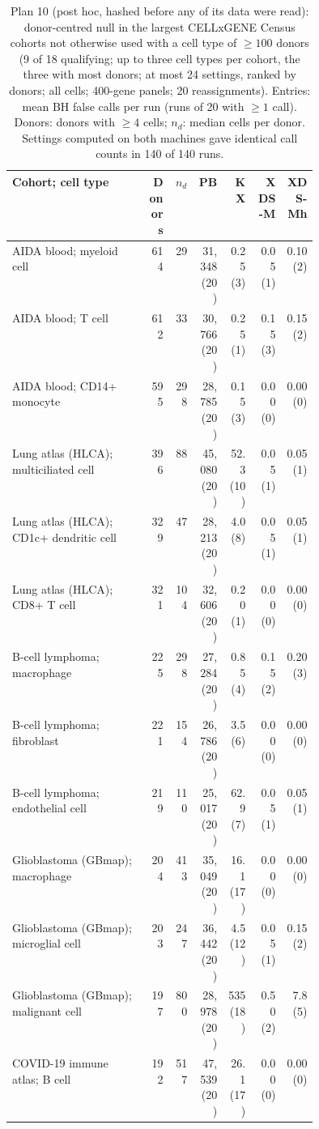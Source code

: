 \begin{table}[h]\centering\footnotesize\setlength{\tabcolsep}{3pt}
\caption{Plan 10 (post hoc, hashed before any of its data were read): donor-centred null in the largest CELLxGENE Census cohorts not otherwise used with a cell type of $\ge100$ donors (9 of 18 qualifying; up to three cell types per cohort, the three with most donors; at most 24 settings, ranked by donors; all cells; 400-gene panels; 20 reassignments). Entries: mean BH false calls per run (runs of 20 with $\ge1$ call). Donors: donors with $\ge4$ cells; $n_d$: median cells per donor. Settings computed on both machines gave identical call counts in 140 of 140 runs.}\label{tab:breadth10}
\begin{tabular}{@{}p{0.44\linewidth}rrrrrr@{}}\toprule
Cohort; cell type & Donors & $n_d$ & PB & KX & XDS-M & XDS-Mh\\\midrule
AIDA blood; myeloid cell & 614 & 29 & 31{,}348 (20) & 0.25 (3) & 0.05 (1) & 0.10 (2)\\
AIDA blood; T cell & 612 & 33 & 30{,}766 (20) & 0.25 (1) & 0.15 (3) & 0.15 (2)\\
AIDA blood; CD14+ monocyte & 595 & 298 & 28{,}785 (20) & 0.15 (3) & 0.00 (0) & 0.00 (0)\\
Lung atlas (HLCA); multiciliated cell & 396 & 88 & 45{,}080 (20) & 52.3 (10) & 0.05 (1) & 0.05 (1)\\
Lung atlas (HLCA); CD1c+ dendritic cell & 329 & 47 & 28{,}213 (20) & 4.0 (8) & 0.05 (1) & 0.05 (1)\\
Lung atlas (HLCA); CD8+ T cell & 321 & 104 & 32{,}606 (20) & 0.20 (1) & 0.00 (0) & 0.00 (0)\\
B-cell lymphoma; macrophage & 225 & 298 & 27{,}284 (20) & 0.85 (4) & 0.15 (2) & 0.20 (3)\\
B-cell lymphoma; fibroblast & 221 & 154 & 26{,}786 (20) & 3.5 (6) & 0.00 (0) & 0.00 (0)\\
B-cell lymphoma; endothelial cell & 219 & 110 & 25{,}017 (20) & 62.9 (7) & 0.05 (1) & 0.05 (1)\\
Glioblastoma (GBmap); macrophage & 204 & 413 & 35{,}049 (20) & 16.1 (17) & 0.00 (0) & 0.00 (0)\\
Glioblastoma (GBmap); microglial cell & 203 & 247 & 36{,}442 (20) & 4.5 (12) & 0.05 (1) & 0.15 (2)\\
Glioblastoma (GBmap); malignant cell & 197 & 800 & 28{,}978 (20) & 535 (18) & 0.50 (2) & 7.8 (5)\\
COVID-19 immune atlas; B cell & 192 & 517 & 47{,}539 (20) & 26.1 (17) & 0.00 (0) & 0.00 (0)\\

\end{tabular}
\end{table}
